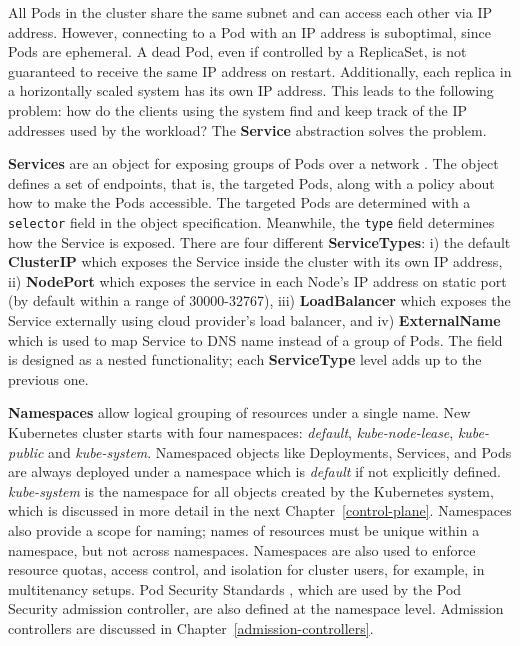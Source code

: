 \documentclass[english, 12pt, a4paper, sci, utf8, a-2b, online]{aaltothesis}
\newcommand{\mycomment}[3]{\textcolor{#1}{#2:~#3}}
\newcommand{\jb}[1]{\noindent\mycomment{aaltoRed}{JB}{#1}}
\begin{document}
All Pods in the cluster share the same subnet and can access each other via IP address.
However, connecting to a Pod with an IP address is suboptimal, since Pods are ephemeral.
A dead Pod, even if controlled by a ReplicaSet, is not guaranteed to receive the same IP address on restart.
Additionally, each replica in a horizontally scaled system has its own IP address.
This leads to the following problem: how do the clients using the system find and keep track of the IP addresses used by the workload? The \textbf{Service} abstraction solves the problem.

\textbf{Services} are an object for exposing groups of Pods over a network \cite{k8s-docs-services}.
The object defines a set of endpoints, that is, the targeted Pods, along with a policy about how to make the Pods accessible.
The targeted Pods are determined with a \lstinline{selector} field in the object specification.
Meanwhile, the \lstinline{type} field determines how the Service is exposed.
There are four different \textbf{ServiceTypes}: i) the default \textbf{ClusterIP} which exposes the Service inside the cluster with its own IP address, ii) \textbf{NodePort} which exposes the service in each Node's IP address on static port (by default within a range of 30000-32767), iii) \textbf{LoadBalancer} which exposes the Service externally using cloud provider's load balancer, and iv) \textbf{ExternalName} which is used to map Service to DNS name instead of a group of Pods.
The field is designed as a nested functionality; each \textbf{ServiceType} level adds up to the previous one.


\textbf{Namespaces} allow logical grouping of resources under a single name.
New Kubernetes cluster starts with four namespaces: \emph{default}, \emph{kube-node-lease}, \emph{kube-public} and \emph{kube-system}.
Namespaced objects like Deployments, Services, and Pods are always deployed under a namespace which is \emph{default} if not explicitly defined.
\emph{kube-system} is the namespace for all objects created by the Kubernetes system, which is discussed in more detail in the next Chapter~\ref{control-plane}.
Namespaces also provide a scope for naming; names of resources must be unique within a namespace, but not across namespaces.
Namespaces are also used to enforce resource quotas, access control, and isolation for cluster users, for example, in multitenancy setups.
Pod Security Standards \cite{k8s-docs-pss}, which are used by the Pod Security admission controller, are also defined at the namespace level.
Admission controllers are discussed in Chapter~\ref{admission-controllers}.
\end{document}
